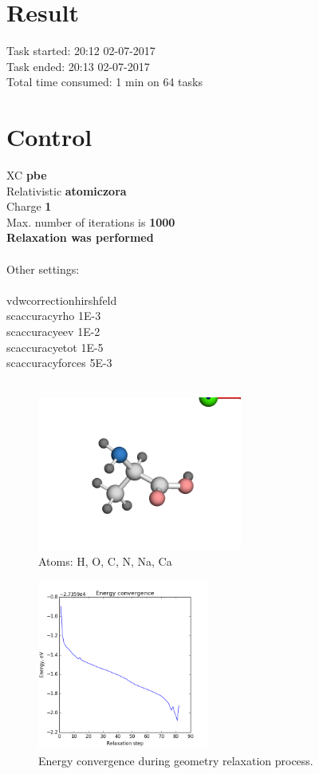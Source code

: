 \documentclass[12pt,a4paper,twocolumn]{report}
\begin{document}
\section*{Result}
Task started: \hfill 20:12 02-07-2017
\\
Task ended: \hfill 20:13 02-07-2017
\\
Total time consumed: 1 min on 64 tasks\\
\section*{Control}
XC  \hfill \textbf{pbe}\\
Relativistic  \hfill \textbf{atomic\textunderscore zora}\\
Charge  \hfill \textbf{1}\\
Max. number of iterations is \hfill \textbf{1000}\\
\textbf{Relaxation was performed\\}
\\
Other settings:\\
\\
vdw\textunderscore correction\textunderscore hirshfeld\\
sc\textunderscore accuracy\textunderscore rho    1E-3\\
sc\textunderscore accuracy\textunderscore eev    1E-2\\
sc\textunderscore accuracy\textunderscore etot   1E-5\\
sc\textunderscore accuracy\textunderscore forces 5E-3\\
\\
\newpage
\begin{figure}[h!]
\caption{Atoms: H, O, C, N, Na, Ca } 
\includegraphics[width=0.6\textwidth]{geometry.png}
\end{figure}
\begin{figure}[H]
\caption{Energy convergence during geometry relaxation process.} 
\includegraphics[width=0.5\textwidth]{energy_convergence.png}
\end{figure}
\end{document}
